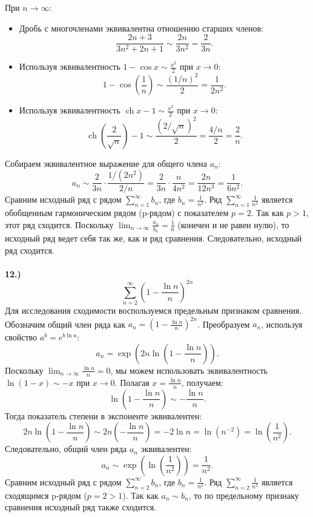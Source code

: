 \documentclass[a4paper, 12pt]{report}
\numberwithin{equation}{section}
\begin{document}
	При $n \to \infty$:
	\begin{itemize}
		\item Дробь с многочленами эквивалентна отношению старших членов:
		$$ \frac{2n+3}{3n^2+2n+1} \sim \frac{2n}{3n^2} = \frac{2}{3n}. $$
		\item Используя эквивалентность $1-\cos x \sim \frac{x^2}{2}$ при $x \to 0$:
		$$ 1-\cos\left(\frac{1}{n}\right) \sim \frac{(1/n)^2}{2} = \frac{1}{2n^2}. $$
		\item Используя эквивалентность $\operatorname{ch} x - 1 \sim \frac{x^2}{2}$ при $x \to 0$:
		$$ \operatorname{ch}\left(\frac{2}{\sqrt{n}}\right) - 1 \sim \frac{(2/\sqrt{n})^2}{2} = \frac{4/n}{2} = \frac{2}{n}. $$
	\end{itemize}
	Собираем эквивалентное выражение для общего члена $a_n$:
	$$ a_n \sim \frac{2}{3n} \cdot \frac{1/(2n^2)}{2/n} = \frac{2}{3n} \cdot \frac{n}{4n^2} = \frac{2n}{12n^3} = \frac{1}{6n^2}. $$
	Сравним исходный ряд с рядом $\sum_{n=1}^{\infty} b_n$, где $b_n = \frac{1}{n^2}$.
	Ряд $\sum_{n=1}^{\infty} \frac{1}{n^2}$ является обобщенным гармоническим рядом (p-рядом) с показателем $p=2$. Так как $p > 1$, этот ряд сходится.
	Поскольку $\lim_{n \to \infty} \frac{a_n}{b_n} = \frac{1}{6}$ (конечен и не равен нулю), то исходный ряд ведет себя так же, как и ряд сравнения.
	Следовательно, исходный ряд сходится.
	\\\\
	\textbf{12.)}
	$$\sum_{n=2}^{\infty} \left(1-\frac{\ln n}{n}\right)^{2n}$$
	Для исследования сходимости воспользуемся предельным признаком сравнения. Обозначим общий член ряда как $a_n = \left(1-\frac{\ln n}{n}\right)^{2n}$.
	Преобразуем $a_n$, используя свойство $a^b = e^{b \ln a}$:
	$$ a_n = \exp\left(2n \ln\left(1-\frac{\ln n}{n}\right)\right). $$
	Поскольку $\lim_{n \to \infty} \frac{\ln n}{n} = 0$, мы можем использовать эквивалентность $\ln(1-x) \sim -x$ при $x \to 0$. Полагая $x = \frac{\ln n}{n}$, получаем:
	$$ \ln\left(1-\frac{\ln n}{n}\right) \sim -\frac{\ln n}{n}. $$
	Тогда показатель степени в экспоненте эквивалентен:
	$$ 2n \ln\left(1-\frac{\ln n}{n}\right) \sim 2n \left(-\frac{\ln n}{n}\right) = -2\ln n = \ln(n^{-2}) = \ln\left(\frac{1}{n^2}\right). $$
	Следовательно, общий член ряда $a_n$ эквивалентен:
	$$ a_n \sim \exp\left(\ln\left(\frac{1}{n^2}\right)\right) = \frac{1}{n^2}. $$
	Сравним исходный ряд с рядом $\sum_{n=2}^{\infty} b_n$, где $b_n = \frac{1}{n^2}$.
	Ряд $\sum_{n=2}^{\infty} \frac{1}{n^2}$ является сходящимся p-рядом ($p=2 > 1$).
	Так как $a_n \sim b_n$, то по предельному признаку сравнения исходный ряд также сходится.
\end{document}
